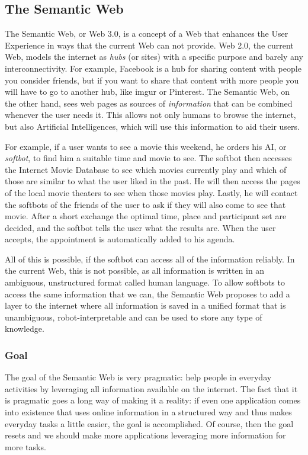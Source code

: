 \documentclass{article}
\begin{document}
 \subsection{The Semantic Web}
 The Semantic Web, or Web 3.0, is a concept of a Web that enhances the User Experience in ways that the current Web can not provide. Web 2.0, the current Web, models the internet as \textit{hubs} (or sites) with a specific purpose and barely any interconnectivity. For example, Facebook is a hub for sharing content with people you consider friends, but if you want to share that content with more people you will have to go to another hub, like imgur or Pinterest.
The Semantic Web, on the other hand, sees web pages as sources of \textit{information} that can be combined whenever the user needs it. This allows not only humans to browse the internet, but also Artificial Intelligences, which will use this information to aid their users.

For example, if a user wants to see a movie this weekend, he orders his AI, or \textit{softbot}, to find him a suitable time and movie to see. The softbot then accesses the Internet Movie Database to see which movies currently play and which of those are similar to what the user liked in the past. He will then access the pages of the local movie theaters to see when those movies play. Lastly, he will contact the softbots of the friends of the user to ask if they will also come to see that movie. After a short exchange the optimal time, place and participant set are decided, and the softbot tells the user what the results are. When the user accepts, the appointment is automatically added to his agenda.

All of this is possible, if the softbot can access all of the information reliably. In the current Web, this is not possible, as all information is written in an ambiguous, unstructured format called human language. To allow softbots to access the same information that we can, the Semantic Web proposes to add a layer to the internet where all information is saved in a unified format that is unambiguous, robot-interpretable and can be used to store any type of knowledge.
 
 \subsubsection{Goal}
 The goal of the Semantic Web is very pragmatic: help people in everyday activities by leveraging all information available on the internet. The fact that it is pragmatic goes a long way of making it a reality: if even one application comes into existence that uses online information in a structured way and thus makes everyday tasks a little easier, the goal is accomplished. Of course, then the goal resets and we should make more applications leveraging more information for more tasks.
\end{document}
